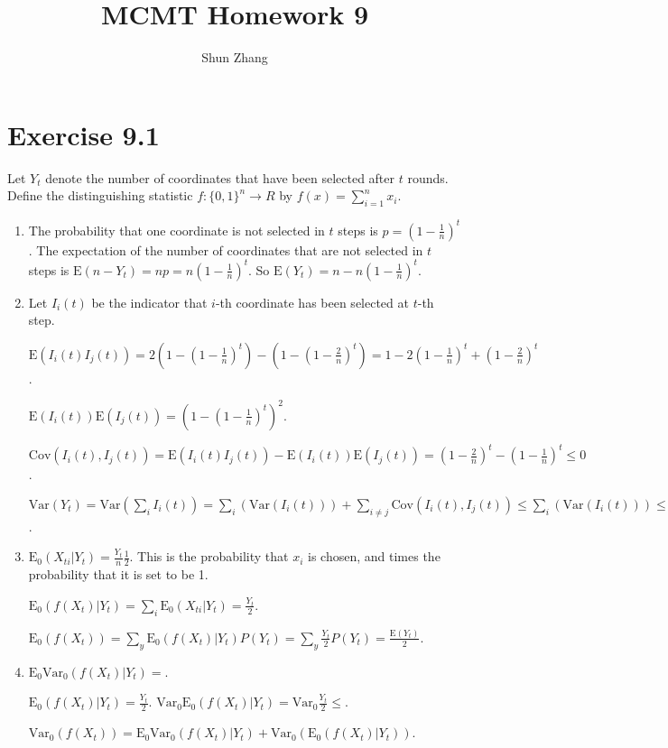 \documentclass[10pt]{article}
\title{MCMT Homework 9}
\author{Shun Zhang}
\date{}
\newcommand{\Cov}{\mathrm{Cov}}
\newcommand{\E}{\mathrm{E}}
\newcommand{\Var}{\mathrm{Var}}
\begin{document}
\maketitle

\section*{Exercise 9.1}

Let $Y_t$ denote the number of coordinates that have been selected after $t$ rounds.
Define the distinguishing statistic $f:\{0,1\}^n \rightarrow R$ by
$f(x)=\sum_{i=1}^n x_i$.

\begin{enumerate}

\item The probability that one coordinate is not selected in $t$ steps is $p = (1 -
\frac{1}{n})^t$. The expectation of the number of coordinates that are not
selected in $t$ steps is $\E(n - Y_t) = np = n(1 - \frac{1}{n})^t$. So $\E(Y_t) =
n - n(1 - \frac{1}{n})^t$.

\item Let $I_i(t)$ be the indicator that $i$-th coordinate has been selected at
$t$-th step.

$\E(I_i(t) I_j(t)) = 2(1 - (1 - \frac{1}{n})^t) - (1 - (1 - \frac{2}{n})^t) = 1
- 2(1 - \frac{1}{n})^t + (1 - \frac{2}{n})^t$.

$\E(I_i(t))\E(I_j(t)) = (1 - (1 - \frac{1}{n})^t)^2$.

$\Cov(I_i(t), I_j(t)) = \E(I_i(t) I_j(t)) - \E(I_i(t))\E(I_j(t)) = (1 -
\frac{2}{n})^t - (1 - \frac{1}{n})^t \leq 0$.

$\Var(Y_t) = \Var(\sum_i I_i(t)) = \sum_i(\Var (I_i(t))) + \sum_{i \neq
j}\Cov(I_i(t), I_j(t)) \leq \sum_i(\Var (I_i(t))) \leq n p(1-p) \leq \frac{n}{4}$.

\item $\E_0(X_{ti} | Y_t) = \frac{Y_t}{n} \frac{1}{2}$. This is the probability
that $x_i$ is chosen, and times the probability that it is set to be 1.

$\E_0(f(X_t) | Y_t) = \sum_i \E_0(X_{ti} | Y_t) = \frac{Y_t}{2}$.

$\E_0(f(X_t)) = \sum_y \E_0(f(X_t) | Y_t) P(Y_t) = \sum_y \frac{Y_t}{2} P(Y_t) =
\frac{\E(Y_t)}{2}$.

\item
$\E_0 \Var_0(f(X_t) | Y_t) = $.

$\E_0(f(X_t) | Y_t) = \frac{Y_t}{2}$.
$\Var_0 \E_0(f(X_t) | Y_t) = \Var_0 \frac{Y_t}{2} \leq $.

$\Var_0(f(X_t)) = \E_0 \Var_0(f(X_t) | Y_t) + \Var_0 (\E_0(f(X_t) | Y_t))$.

\end{enumerate}
\end{document}

